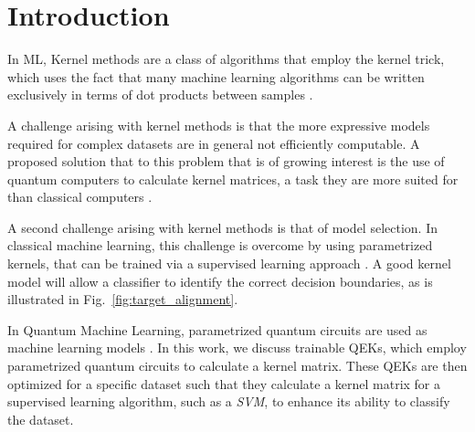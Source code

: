 \documentclass[twocolumn,superscriptaddress,nofootinbib]{revtex4-2}
\newcommand{\todo}[1]{\textcolor{red}{[TODO: #1]}}
\begin{document}
\maketitle
\begin{acronym}[UMLX]
\end{acronym}

\section{Introduction}
In \ac{ML}, Kernel methods are a class of algorithms that employ the kernel trick, which uses the fact that many machine learning algorithms can be written exclusively in terms of dot products between samples \cite{scholkopf2018learning}.  

A challenge arising with kernel methods is that the more expressive models required for complex datasets are in general not efficiently computable.
A proposed solution that to this problem that is of growing interest is the use of quantum computers to calculate kernel matrices, a task they are more suited for than classical computers \cite{heredge2021quantumSVMMeson, bartkiewicz2020ExperimentalKernelFinite, Li2015ExperimentalqSVM}.

A second challenge arising with kernel methods is that of model selection. In classical machine learning, this challenge is overcome by using parametrized kernels, that can be trained via a supervised learning approach \cite{baramLearningPolarization, wangOverviewKernelAlignment2015, cristianiniKernelTargetAlignment2006}. A good kernel model will allow a classifier to identify the correct decision boundaries, as is illustrated in  Fig.~\ref{fig:target_alignment}.

In Quantum Machine Learning, parametrized quantum circuits are used as machine learning models \cite{schuldSupervisedLearningQuantum2018a,wittek2014quantum,lloydQuantumPrincipalComponent2014, schuldEffectDataEncoding2020}. 
In this work, we discuss trainable \acp{QEK}, which employ parametrized quantum circuits to calculate a kernel matrix. 
These \acp{QEK} are then optimized for a specific dataset such that they calculate a kernel matrix for a supervised learning algorithm, such as a \emph{\ac{SVM}}, to enhance its ability to classify the dataset. 
\end{document}
